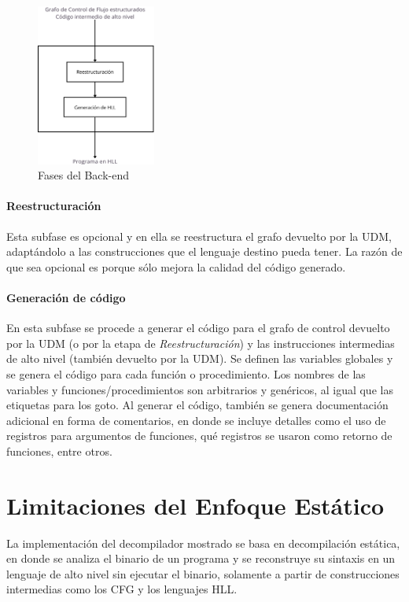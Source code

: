 \documentclass[runningheads]{llncs}
\begin{document}
\begin{figure}
  \vspace{-25pt}
  \centering
  \includegraphics[width=0.35\textwidth]{backend-phases.png}
  \caption{Fases del Back-end}
  \label{fig: backend-phases}
  \vspace{-50pt}
\end{figure}

\paragraph{Reestructuración} Esta subfase es opcional y en ella se reestructura el grafo devuelto por 
la UDM, adaptándolo a las construcciones que el lenguaje destino pueda tener. La razón de que sea 
opcional es porque sólo mejora la calidad del código generado.

\paragraph{Generación de código} En esta subfase se procede a generar el código para el grafo de 
control devuelto por la UDM (o por la etapa de \textit{Reestructuración}) y las instrucciones 
intermedias de alto nivel (también devuelto por la UDM). Se definen las variables globales y se 
genera el código para cada función o procedimiento. Los nombres de las variables y 
funciones/procedimientos son arbitrarios y genéricos, al igual que las etiquetas para los goto.
Al generar el código, también se genera documentación adicional en forma de comentarios, 
en donde se incluye detalles como el uso de registros para argumentos de funciones, qué registros 
se usaron como retorno de funciones, entre otros.

\section{Limitaciones del Enfoque Estático}
La implementación del decompilador mostrado se basa en decompilación estática, en donde se analiza 
el binario de un programa y se reconstruye su sintaxis en un lenguaje de alto nivel sin ejecutar el 
binario, solamente a partir de construcciones intermedias como los CFG y los lenguajes HLL.
\end{document}

